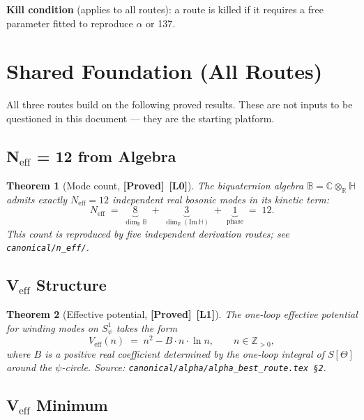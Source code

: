 \documentclass[12pt,a4paper]{article}
\newtheorem{theorem}{Theorem}[section]
\theoremstyle{definition}
\theoremstyle{remark}
\newcommand{\BB}{\mathbb{B}}
\newcommand{\CC}{\mathbb{C}}
\newcommand{\RR}{\mathbb{R}}
\newcommand{\HH}{\mathbb{H}}
\newcommand{\ZZ}{\mathbb{Z}}
\newcommand{\PROVED}{\textbf{[Proved]}}
\newcommand{\Lone}{\textbf{[L1]}}
\newcommand{\Lzero}{\textbf{[L0]}}
\begin{document}
\textbf{Kill condition} (applies to all routes): a route is killed if it requires
a free parameter fitted to reproduce $\alpha$ or 137.

\section{Shared Foundation (All Routes)}
\label{sec:alpha_foundation}

All three routes build on the following proved results.
These are not inputs to be questioned in this document --- they are
the starting platform.

\subsection{N$_{\mathrm{eff}}$ = 12 from Algebra}

\begin{theorem}[Mode count, \PROVED\ \Lzero]
\label{thm:neff}
The biquaternion algebra $\BB = \CC\otimes_\RR\HH$ admits exactly
$N_{\mathrm{eff}} = 12$ independent real bosonic modes in its kinetic term:
\[
  N_{\mathrm{eff}}
  \;=\;
  \underbrace{8}_{\dim_\RR\BB}
  \;+\;
  \underbrace{3}_{\dim_\RR(\mathrm{Im}\,\HH)}
  \;+\;
  \underbrace{1}_{\mathrm{phase}}
  \;=\; 12.
\]
This count is reproduced by five independent derivation routes;
see \texttt{canonical/n\_eff/}.
\end{theorem}

\subsection{V$_{\mathrm{eff}}$ Structure}

\begin{theorem}[Effective potential, \PROVED\ \Lone]
\label{thm:veff}
The one-loop effective potential for winding modes on $S^1_\psi$ takes the form
\[
  V_{\mathrm{eff}}(n)
  \;=\;
  n^2 - B \cdot n \cdot \ln n,
  \qquad n \in \ZZ_{>0},
\]
where $B$ is a positive real coefficient determined by the one-loop integral
of $S[\Theta]$ around the $\psi$-circle.
Source: \texttt{canonical/alpha/alpha\_best\_route.tex §2}.
\end{theorem}

\subsection{V$_{\mathrm{eff}}$ Minimum}
\end{document}
